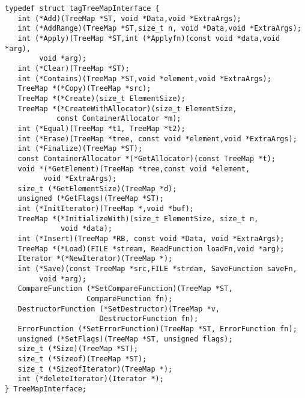 \begin{verbatim}
typedef struct tagTreeMapInterface {
   int (*Add)(TreeMap *ST, void *Data,void *ExtraArgs); 
   int (*AddRange)(TreeMap *ST,size_t n, void *Data,void *ExtraArgs);
   int (*Apply)(TreeMap *ST,int (*Applyfn)(const void *data,void *arg),
        void *arg);
   int (*Clear)(TreeMap *ST); 
   int (*Contains)(TreeMap *ST,void *element,void *ExtraArgs);
   TreeMap *(*Copy)(TreeMap *src);
   TreeMap *(*Create)(size_t ElementSize);
   TreeMap *(*CreateWithAllocator)(size_t ElementSize,
            const ContainerAllocator *m);
   int (*Equal)(TreeMap *t1, TreeMap *t2);
   int (*Erase)(TreeMap *tree, const void *element,void *ExtraArgs); 
   int (*Finalize)(TreeMap *ST); 
   const ContainerAllocator *(*GetAllocator)(const TreeMap *t);
   void *(*GetElement)(TreeMap *tree,const void *element,
         void *ExtraArgs);
   size_t (*GetElementSize)(TreeMap *d);
   unsigned (*GetFlags)(TreeMap *ST); 
   int (*InitIterator)(TreeMap *,void *buf);
   TreeMap *(*InitializeWith)(size_t ElementSize, size_t n,
             void *data);
   int (*Insert)(TreeMap *RB, const void *Data, void *ExtraArgs);
   TreeMap *(*Load)(FILE *stream, ReadFunction loadFn,void *arg);
   Iterator *(*NewIterator)(TreeMap *);
   int (*Save)(const TreeMap *src,FILE *stream, SaveFunction saveFn,
        void *arg);
   CompareFunction (*SetCompareFunction)(TreeMap *ST,
                   CompareFunction fn);
   DestructorFunction (*SetDestructor)(TreeMap *v,
                      DestructorFunction fn);
   ErrorFunction (*SetErrorFunction)(TreeMap *ST, ErrorFunction fn);
   unsigned (*SetFlags)(TreeMap *ST, unsigned flags); 
   size_t (*Size)(TreeMap *ST); 
   size_t (*Sizeof)(TreeMap *ST);
   size_t (*SizeofIterator)(TreeMap *);
   int (*deleteIterator)(Iterator *);
} TreeMapInterface;
\end{verbatim}
